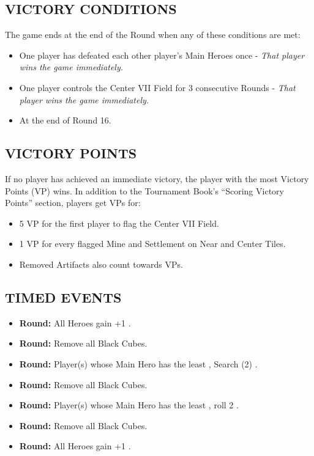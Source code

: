 \begin{multicols*}{2}
\subsection*{\MakeUppercase{Victory Conditions}}
The game ends at the end of the Round when any of these conditions are met:

\begin{itemize}
  \item One player has defeated each other player's Main Heroes once - \textit{That player wins the game immediately.}
  \item One player controls the Center VII Field for 3 consecutive Rounds - \textit{That player wins the game immediately.}
  \item At the end of Round 16.
\end{itemize}

\subsection*{\MakeUppercase{Victory Points}}
If no player has achieved an immediate victory, the player with the most Victory Points (VP) wins.
In addition to the Tournament Book's ``Scoring Victory Points'' section, players get VPs for:

\begin{itemize}
  \item 5 VP for the first player to flag the Center VII Field.
  \item 1 VP for every flagged Mine and Settlement on Near and Center Tiles.
  \item Removed Artifacts also count towards VPs.
\end{itemize}

\subsection*{\MakeUppercase{Timed Events}}

\begin{itemize}
  \item[\textbf{\nth{1}}] \textbf{Round:} All Heroes gain +1 .
  \item[\textbf{\nth{4}}] \textbf{Round:} Remove all Black Cubes.
  \item[\textbf{\nth{6}}] \textbf{Round:} Player(s) whose Main Hero has the least , Search (2) .
  \item[\textbf{\nth{9}}] \textbf{Round:} Remove all Black Cubes.
  \item[\textbf{\nth{10}}] \textbf{Round:} Player(s) whose Main Hero has the least , roll 2 .
  \item[\textbf{\nth{12}}] \textbf{Round:} Remove all Black Cubes.
  \item[\textbf{\nth{13}}] \textbf{Round:} All Heroes gain +1 .
\end{itemize}

\end{multicols*}

